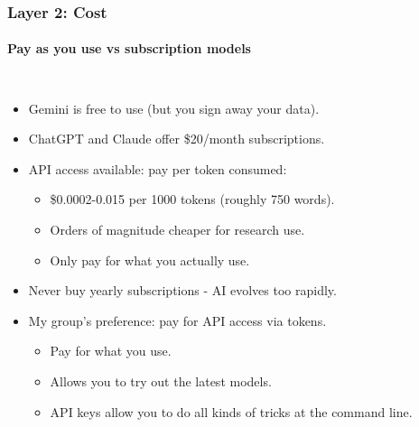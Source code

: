 \documentclass[aspectratio=169]{beamer}
\begin{document}
\begin{frame}
    \frametitle{Layer 2: Cost}
    \framesubtitle{Pay as you use vs subscription models}
    
    \begin{columns}
        \begin{itemize}
            \item Gemini is free to use (but you sign away your data).
            \item ChatGPT and Claude offer \$20/month subscriptions.
            \item API access available: pay per token consumed:
                \begin{itemize}
                    \item \$0.0002-0.015 per 1000 tokens (roughly 750 words).
                    \item Orders of magnitude cheaper for research use.
                    \item Only pay for what you actually use.
                \end{itemize}
            \item Never buy yearly subscriptions - AI evolves too rapidly.
            \item My group's preference: pay for API access via tokens.
                \begin{itemize}
                    \item Pay for what you use.
                    \item Allows you to try out the latest models.
                    \item API keys allow you to do all kinds of tricks at the command line.
                \end{itemize}
        \end{itemize}
        

\end{columns}
\end{frame}
\end{document}

